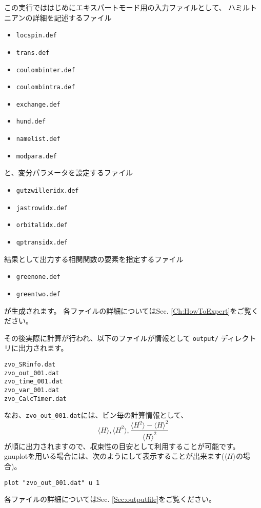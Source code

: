 この実行でははじめにエキスパートモード用の入力ファイルとして、
ハミルトニアンの詳細を記述するファイル
\begin{itemize}
\item \verb|locspin.def|
\item \verb|trans.def|
\item \verb|coulombinter.def|
\item \verb|coulombintra.def|
\item \verb|exchange.def|
\item \verb|hund.def|
\item \verb|namelist.def|
\item \verb|modpara.def|
\end{itemize}
と、変分パラメータを設定するファイル
\begin{itemize}
\item \verb|gutzwilleridx.def|
\item \verb|jastrowidx.def|
\item \verb|orbitalidx.def|
\item \verb|qptransidx.def|
\end{itemize}
結果として出力する相関関数の要素を指定するファイル
\begin{itemize}
\item \verb|greenone.def|
\item \verb|greentwo.def|
\end{itemize}
が生成されます。
各ファイルの詳細についてはSec. \ref{Ch:HowToExpert}をご覧ください。

その後実際に計算が行われ、以下のファイルが情報として \verb|output/| ディレクトリに出力されます。
\\
\begin{minipage}{12cm}
  \begin{screen}
\begin{verbatim}
zvo_SRinfo.dat
zvo_out_001.dat
zvo_time_001.dat
zvo_var_001.dat
zvo_CalcTimer.dat
\end{verbatim}
  \end{screen}
\end{minipage}

なお、\verb|zvo_out_001.dat|には、ビン毎の計算情報として、
\begin{equation}
\langle H \rangle, \langle H^2 \rangle, \frac{\langle H^2 \rangle- \langle H \rangle^2 }{\langle H \rangle^2} \nonumber
\end{equation}
が順に出力されますので、収束性の目安として利用することが可能です。
gnuplotを用いる場合には、次のようにして表示することが出来ます($\langle H \rangle$の場合)。
\begin{verbatim}
plot "zvo_out_001.dat" u 1
\end{verbatim}
各ファイルの詳細についてはSec. \ref{Sec:outputfile}をご覧ください。\\

